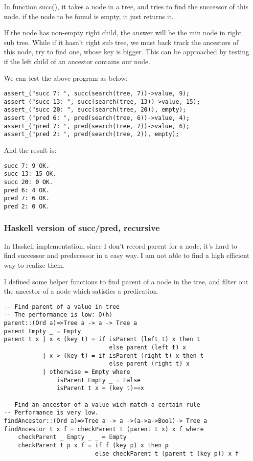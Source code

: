 \documentclass{article}
\begin{document}
In function succ(), it takes a node in a tree, and tries to find the successor
of this node. if the node to be found is empty, it just returns it.

If the node has non-empty right child, the answer will be the min node in right
sub tree. While if it hasn't right sub tree, we must back track the ancestors 
of this node, try to find one, whose key is bigger. This can be approached 
by testing if the left child of an ancestor contains our node.

We can test the above program as below:

\begin{lstlisting}
assert_("succ 7: ", succ(search(tree, 7))->value, 9);
assert_("succ 13: ", succ(search(tree, 13))->value, 15);
assert_("succ 20: ", succ(search(tree, 20)), empty);
assert_("pred 6: ", pred(search(tree, 6))->value, 4);
assert_("pred 7: ", pred(search(tree, 7))->value, 6);
assert_("pred 2: ", pred(search(tree, 2)), empty);
\end{lstlisting}

And the result is:
\begin{verbatim}
succ 7: 9 OK.
succ 13: 15 OK.
succ 20: 0 OK.
pred 6: 4 OK.
pred 7: 6 OK.
pred 2: 0 OK.
\end{verbatim}

\subsubsection*{Haskell version of succ/pred, recursive}

In Haskell implementation, since I don't record parent for a node, it's hard
to find successor and predecessor in a easy way. I am not able to find a high
efficient way to realize them.

I defined some helper functions to find parent of a node in the tree, and filter
out the ancestor of a node which satisfies a predication. 

\lstset{language=Haskell}
\begin{lstlisting}
-- Find parent of a value in tree
-- The performance is low: O(h)
parent::(Ord a)=>Tree a -> a -> Tree a
parent Empty _ = Empty
parent t x | x < (key t) = if isParent (left t) x then t 
                              else parent (left t) x
           | x > (key t) = if isParent (right t) x then t 
                              else parent (right t) x
           | otherwise = Empty where
               isParent Empty _ = False
               isParent t x = (key t)==x

-- Find an ancestor of a value wich match a certain rule
-- Performance is very low.
findAncestor::(Ord a)=>Tree a -> a ->(a->a->Bool)-> Tree a
findAncestor t x f = checkParent t (parent t x) x f where
    checkParent _ Empty _ _ = Empty
    checkParent t p x f = if f (key p) x then p
                          else checkParent t (parent t (key p)) x f
\end{lstlisting}
\end{document}
